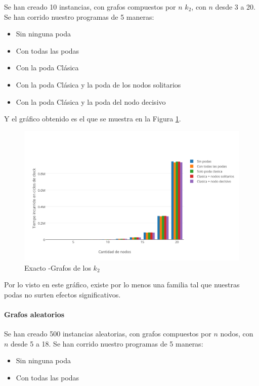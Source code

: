 Se han creado 10 instancias, con grafos compuestos por $n$ $k_2$, con $n$ desde 3 a 20. Se han corrido nuestro programas de 5 maneras:

\begin{itemize}
	\item Sin ninguna poda
	\item Con todas las podas 
	\item Con la poda Clásica
	\item Con la poda Clásica y la poda de los nodos solitarios
	\item Con la poda Clásica y la poda del nodo decisivo
\end{itemize}

Y el gráfico obtenido es el que se muestra en la Figura \ref{fig:1E}.

\begin{figure}[htb]
	\begin{center}
    		\includegraphics[scale=0.6]{imagenes/exacto-k2ord.png}
	\end{center}
	\caption{Exacto -Grafos de los $k_2$}\label{fig:1E}
\end{figure}
\FloatBarrier

Por lo visto en este gráfico, existe por lo menos una familia tal que nuestras podas no surten efectos significativos.

\paragraph{Grafos aleatorios}

Se han creado 500 instancias aleatorias, con grafos compuestos por $n$ nodos, con $n$ desde 5 a 18. Se han corrido nuestro programas de 5 maneras:

\begin{itemize}
	\item Sin ninguna poda
	\item Con todas las podas 
\end{itemize}

